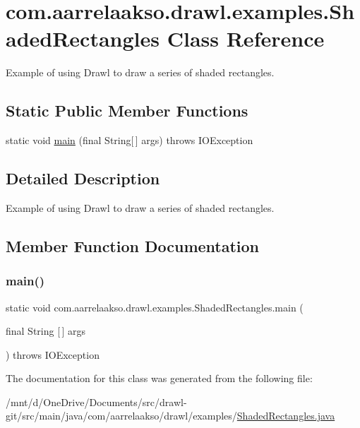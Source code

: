 \hypertarget{classcom_1_1aarrelaakso_1_1drawl_1_1examples_1_1_shaded_rectangles}{}\section{com.\+aarrelaakso.\+drawl.\+examples.\+Shaded\+Rectangles Class Reference}
\label{classcom_1_1aarrelaakso_1_1drawl_1_1examples_1_1_shaded_rectangles}


Example of using Drawl to draw a series of shaded rectangles.  


\subsection*{Static Public Member Functions}
\begin{DoxyCompactItemize}
\item 
static void \hyperlink{classcom_1_1aarrelaakso_1_1drawl_1_1examples_1_1_shaded_rectangles_ab424863604fa74c48452d2c267e16463}{main} (final String\mbox{[}$\,$\mbox{]} args)  throws I\+O\+Exception     
\end{DoxyCompactItemize}


\subsection{Detailed Description}
Example of using Drawl to draw a series of shaded rectangles. 

\subsection{Member Function Documentation}
\mbox{\label{classcom_1_1aarrelaakso_1_1drawl_1_1examples_1_1_shaded_rectangles_ab424863604fa74c48452d2c267e16463}} 
\subsubsection{\texorpdfstring{main()}{main()}}
{\footnotesize\ttfamily static void com.\+aarrelaakso.\+drawl.\+examples.\+Shaded\+Rectangles.\+main (\begin{DoxyParamCaption}\item[{final String \mbox{[}$\,$\mbox{]}}]{args }\end{DoxyParamCaption}) throws I\+O\+Exception\hspace{0.3cm}{\ttfamily [static]}}



The documentation for this class was generated from the following file\+:\begin{DoxyCompactItemize}
\item 
/mnt/d/\+One\+Drive/\+Documents/src/drawl-\/git/src/main/java/com/aarrelaakso/drawl/examples/\hyperlink{_shaded_rectangles_8java}{Shaded\+Rectangles.\+java}\end{DoxyCompactItemize}
